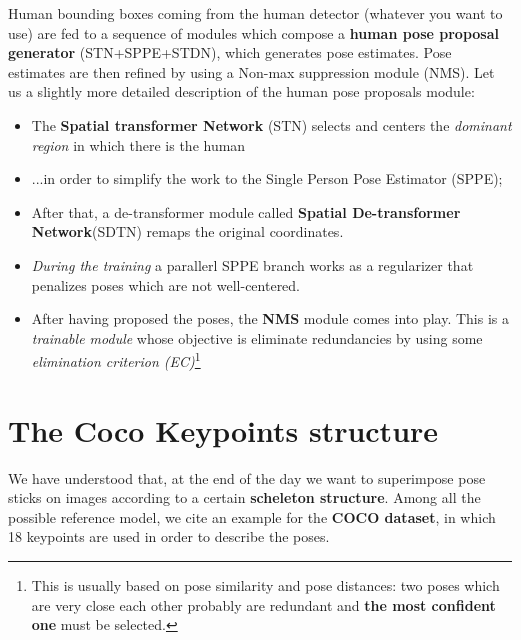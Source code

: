 \noindent
Human bounding boxes coming from the human detector (whatever you want to use) are fed to a sequence of modules which compose a \textbf{human pose proposal generator} (STN+SPPE+STDN), which generates pose estimates. Pose estimates are then refined by using a Non-max suppression module (NMS). Let us a slightly more detailed description of the human pose proposals module: 
\begin{itemize}
    \itemsep-0.3em
    \item The \textbf{Spatial transformer Network} (STN) selects and centers the \textit{dominant region} in which there is the human 
    \item ...in order to simplify the work to the Single Person Pose Estimator (SPPE); 
    \item After that, a de-transformer module called \textbf{Spatial De-transformer Network}(SDTN) remaps the original coordinates. 
    \item \textit{During the training} a parallerl SPPE branch works as a regularizer that penalizes poses which are not well-centered.
    \item After having proposed the poses, the \textbf{NMS} module comes into play. This is a \textit{trainable module} whose objective is eliminate redundancies by using some \textit{elimination criterion (EC)}\footnote{
        This is usually based on pose similarity and pose distances: two poses which are very close each other probably are redundant and \textbf{the most confident one} must be selected.
    }
\end{itemize}

\section{The Coco Keypoints structure}
We have understood that, at the end of the day we want to superimpose pose sticks on images according to a certain \textbf{scheleton structure}. Among all the possible reference model, we cite an example for the \textbf{COCO dataset}, in which 18 keypoints are used in order to describe the poses.

